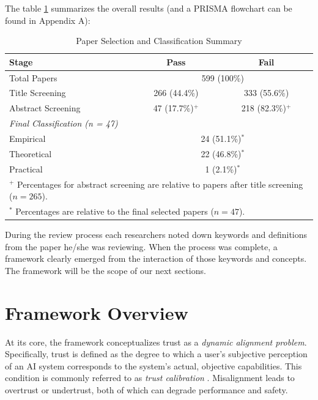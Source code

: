 \documentclass[sigconf]{acmart}
\begin{document}
The table \ref{tab:selection_summary} summarizes the overall results (and a PRISMA flowchart can be found in Appendix A):

\begin{table}[h]
\centering
\begin{tabular}{lcc}
\toprule
\textbf{Stage} & \textbf{Pass} & \textbf{Fail} \\
\midrule
Total Papers & \multicolumn{2}{c}{599 (100\%)} \\

Title Screening & 266 (44.4\%) & 333 (55.6\%) \\

Abstract Screening & 47 (17.7\%)$^{+}$ & 218 (82.3\%)$^{+}$ \\
\midrule

\multicolumn{3}{l}{\textit{Final Classification (n = 47)}} \\

Empirical   & \multicolumn{2}{c}{24 (51.1\%)$^{*}$} \\
Theoretical & \multicolumn{2}{c}{22 (46.8\%)$^{*}$} \\
Practical   & \multicolumn{2}{c}{1 (2.1\%)$^{*}$} \\
\midrule

\multicolumn{3}{p{0.9\linewidth}}{\footnotesize
$^{+}$ Percentages for abstract screening are relative to papers after title screening ($n = 265$).} \\

\multicolumn{3}{p{0.9\linewidth}}{\footnotesize
$^{*}$ Percentages are relative to the final selected papers ($n = 47$).} \\

\bottomrule
\end{tabular}
\caption{Paper Selection and Classification Summary}
\label{tab:selection_summary}
\end{table}
During the review process each researchers noted down keywords and definitions from the paper he/she was reviewing. 
When the process was complete, a framework clearly emerged from the interaction of those keywords and concepts. The framework will be the scope of our next sections.

\section{Framework Overview}

At its core, the framework conceptualizes trust as a \emph{dynamic alignment problem}. Specifically, trust is defined as the degree to which a user's subjective perception of an AI system corresponds to the system’s actual, objective capabilities. This condition is commonly referred to as \emph{trust calibration} \cite{jacovi_2021_formalizing_trust_ai, carsten_hmi_automated_cars}. Misalignment leads to overtrust or undertrust, both of which can degrade performance and safety.
\end{document}
